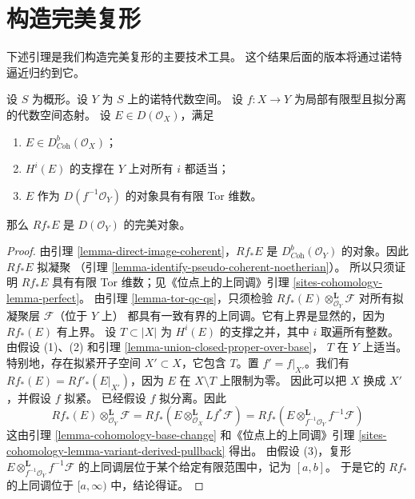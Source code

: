 \section{构造完美复形}
\label{section-producing-perfect}

\noindent
下述引理是我们构造完美复形的主要技术工具。
这个结果后面的版本将通过诺特逼近归约到它。

\begin{lemma}
\label{lemma-perfect-direct-image}
设 $S$ 为概形。设 $Y$ 为 $S$ 上的诺特代数空间。
设 $f : X \to Y$ 为局部有限型且拟分离的代数空间态射。
设 $E \in D(\mathcal{O}_X)$，满足
\begin{enumerate}
\item $E \in D^b_{\textit{Coh}}(\mathcal{O}_X)$；
\item $H^i(E)$ 的支撑在 $Y$ 上对所有 $i$ 都适当；
\item $E$ 作为 $D(f^{-1}\mathcal{O}_Y)$ 的对象具有有限 Tor 维数。
\end{enumerate}
那么 $Rf_*E$ 是 $D(\mathcal{O}_Y)$ 的完美对象。
\end{lemma}

\begin{proof}
由引理 \ref{lemma-direct-image-coherent}，$Rf_*E$ 是
$D^b_{\textit{Coh}}(\mathcal{O}_Y)$ 的对象。因此 $Rf_*E$ 拟凝聚
（引理 \ref{lemma-identify-pseudo-coherent-noetherian}）。
所以只须证明 $Rf_*E$ 具有有限 Tor 维数；见《位点上的上同调》引理
\ref{sites-cohomology-lemma-perfect}。
由引理 \ref{lemma-tor-qc-qs}，只须检验
$Rf_*(E) \otimes_{\mathcal{O}_Y}^\mathbf{L} \mathcal{F}$
对所有拟凝聚层 $\mathcal{F}$（位于 $Y$ 上）
都具有一致有界的上同调。它有上界是显然的，因为 $Rf_*(E)$ 有上界。
设 $T \subset |X|$ 为 $H^i(E)$ 的支撑之并，其中 $i$ 取遍所有整数。
由假设 (1)、(2) 和引理 \ref{lemma-union-closed-proper-over-base}，
$T$ 在 $Y$ 上适当。特别地，存在拟紧开子空间
$X' \subset X$，它包含 $T$。置 $f' = f|_{X'}$。我们有
$Rf_*(E) = Rf'_*(E|_{X'})$，因为 $E$ 在
$X \setminus T$ 上限制为零。
因此可以把 $X$ 换成 $X'$，并假设 $f$ 拟紧。
已经假设 $f$ 拟分离。因此
$$
Rf_*(E) \otimes_{\mathcal{O}_Y}^\mathbf{L} \mathcal{F} =
Rf_*\left(E \otimes_{\mathcal{O}_X}^\mathbf{L} Lf^*\mathcal{F}\right) =
Rf_*\left(E \otimes_{f^{-1}\mathcal{O}_Y}^\mathbf{L} f^{-1}\mathcal{F}\right)
$$
这由引理 \ref{lemma-cohomology-base-change} 和《位点上的上同调》引理
\ref{sites-cohomology-lemma-variant-derived-pullback} 得出。
由假设 (3)，复形
$E \otimes_{f^{-1}\mathcal{O}_Y}^\mathbf{L} f^{-1}\mathcal{F}$
的上同调层位于某个给定有限范围中，记为 $[a, b]$。
于是它的 $Rf_*$ 的上同调位于 $[a, \infty)$ 中，结论得证。
\end{proof}

